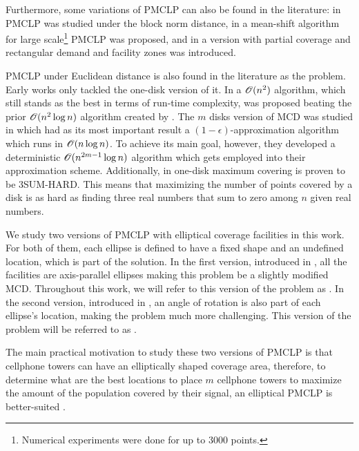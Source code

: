 Furthermore, some variations of PMCLP can also be found in the literature: in  PMCLP was studied under the block norm distance, in  a mean-shift algorithm for large scale\footnote{Numerical experiments were done for up to $3000$ points.} PMCLP was proposed, and in  a version with partial coverage and rectangular demand and facility zones was introduced.

PMCLP under Euclidean distance is also found in the literature as the  problem.
Early works only tackled the one-disk version of it. In  a $\mathscr{O}(n^2)$ algorithm, which still stands as the best in terms of run-time complexity, was proposed beating the prior $\mathscr{O}(n^2\log{n})$ algorithm created by .
The $m$ disks version of MCD was studied in  which had as its most important result a $(1-\epsilon)$-approximation algorithm which runs in $\mathscr{O}(n\log{n})$. To achieve its main goal, however, they developed a deterministic $\mathscr{O}(n^{2m-1}\log{n})$ algorithm which gets employed into their approximation scheme.
Additionally, in  one-disk maximum covering is proven to be 3SUM-HARD. This means that maximizing the number of points covered by a disk is as hard as finding three real numbers that sum to zero among $n$ given real numbers.

We study two versions of PMCLP with elliptical coverage facilities in this work. For both of them, each ellipse is defined to have a fixed shape and an undefined location, which is part of the solution.
In the first version, introduced in , all the facilities are axis-parallel ellipses making this problem be a slightly modified MCD. Throughout this work, we will refer to this version of the problem as .
In the second version, introduced in , an angle of rotation is also part of each ellipse's location, making the problem much more challenging.
This version of the problem will be referred to as .

The main practical motivation to study these two versions of PMCLP is that cellphone towers can have an elliptically shaped coverage area, therefore, to determine what are the best locations to place $m$ cellphone towers to maximize the amount of the population covered by their signal, an elliptical PMCLP is better-suited \cite{canbolat}.


